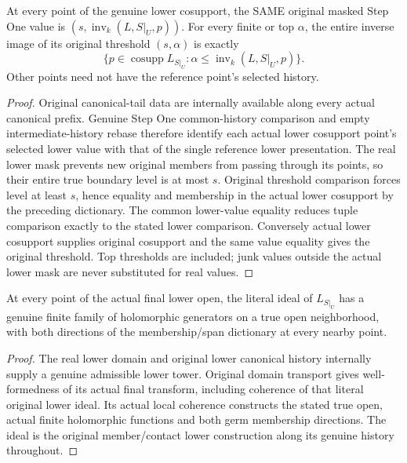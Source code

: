 \begin{theorem}
\label{hir:original-frozen-recursive-lower-whole-threshold-dictionary}
\leanok
{}
At every point of the genuine lower cosupport, the SAME original masked
Step One value is $(s,\operatorname{inv}_k(L,S|_U,p))$.
For every finite or top $\alpha$, the entire inverse image of its original
threshold $(s,\alpha)$ is exactly
\[
 \{p\in\operatorname{cosupp}L_{S|_U}:
               \alpha\le\operatorname{inv}_k(L,S|_U,p)\}.
\]
Other points need not have the reference point's selected history.
\end{theorem}
\begin{proof}
Original canonical-tail data are internally available along every actual
canonical prefix. Genuine Step One common-history comparison and empty
intermediate-history rebase therefore identify each actual lower
cosupport point's selected lower value with that of the single reference
lower presentation. The real lower mask prevents new original members
from passing through its points, so their entire true boundary level is
at most $s$. Original threshold comparison forces level at least $s$,
hence equality and membership in the actual lower cosupport by the
preceding dictionary. The common lower-value equality reduces tuple
comparison exactly to the stated lower comparison. Conversely actual
lower cosupport supplies original cosupport and the same value equality
gives the original threshold. Top thresholds are included; junk values
outside the actual lower mask are never substituted for real values.
\end{proof}

\begin{theorem}
\label{hir:original-frozen-recursive-lower-coherent-generators}
\leanok
{}
At every point of the actual final lower open, the literal ideal of
$L_{S|_U}$ has a genuine finite family of holomorphic generators on a
true open neighborhood, with both directions of the membership/span
dictionary at every nearby point.
\end{theorem}
\begin{proof}
The real lower domain and original lower canonical history internally
supply a genuine admissible lower tower. Original domain transport gives
well-formedness of its actual final transform, including coherence of
that literal original lower ideal. Its actual local coherence constructs
the stated true open, actual finite holomorphic functions and both germ
membership directions. The ideal is the original member/contact lower
construction along its genuine history throughout.
\end{proof}

